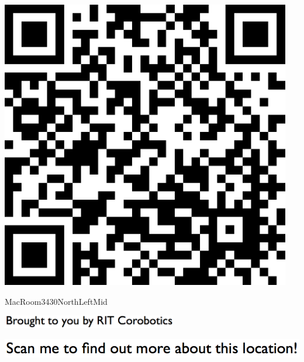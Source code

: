 \documentclass[letterpaper]{article}
\begin{document}
 \begingroup 
 \centerline{\includegraphics[scale=1,width=5in,height=5in]{MacRoom3430NorthLeftMid.png}} 
 \endgroup 
 \vspace*{\fill} 

 \hfill{\small MacRoom3430NorthLeftMid} 

  \vspace{0.7in} 
 
 \centerline{\includegraphics[scale=1,width=3in]{text-bottom.png}} 
 
 \pagebreak 
{} 
 \vspace*{\fill} 
 
  \centerline{\includegraphics[scale=1,width=6in]{text-top.png}} 
 
 \vspace{0.5in} 
 
\end{document}
